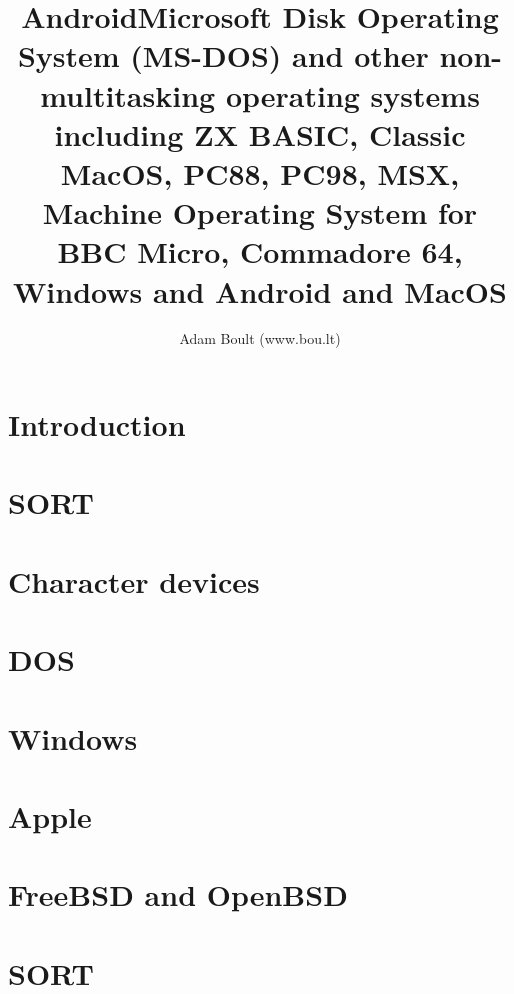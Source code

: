 \documentclass[oneside]{book}
\begin{document}
\author{Adam Boult (www.bou.lt)}
\title{Android}
\title{Microsoft Disk Operating System (MS-DOS) and other non-multitasking operating systems including ZX BASIC, Classic MacOS, PC88, PC98, MSX, Machine Operating System for BBC Micro, Commadore 64, Windows and Android and MacOS}
\maketitle

\setcounter{tocdepth}{0}
\tableofcontents



\part{Introduction}

\part{SORT}


\part{Character devices}


\part{DOS}

\part{Windows}

\part{Apple}

\part{FreeBSD and OpenBSD}

\part{SORT}

\end{document}
